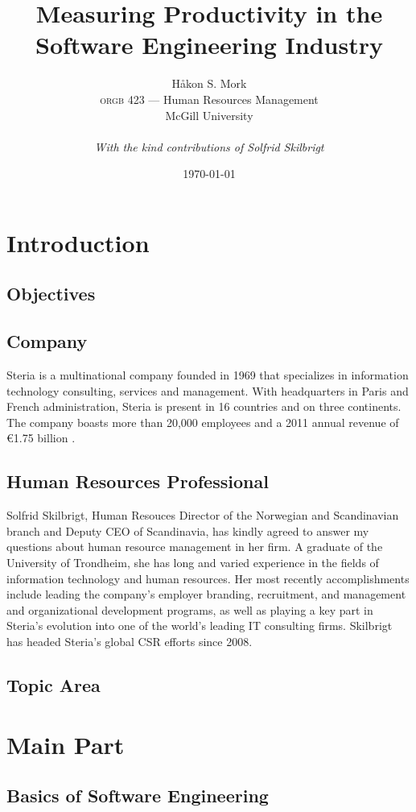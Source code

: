 \documentclass[letterpaper, 12pt]{report}
\title{\Huge \textbf{Measuring Productivity in the Software Engineering Industry}}
\author{
	Håkon S. Mork \\ 
	\textsc{orgb} 423 --- Human Resources Management \\
	McGill University \\
	\\
	\emph{With the kind contributions of Solfrid Skilbrigt}
}
\date{\today}
\begin{document}
\maketitle
\tableofcontents

\chapter{Introduction}
\section{Objectives}
\section{Company}
Steria is a multinational company founded in 1969 that specializes in information technology consulting, services and management. 
With headquarters in Paris and French administration, Steria is present in 16 countries and on three continents. 
The company boasts more than 20,000 employees and a 2011 annual revenue of €1.75 billion \parencite{steria:stats}.

\section{Human Resources Professional}
Solfrid Skilbrigt, Human Resouces Director of the Norwegian and Scandinavian branch and Deputy CEO of Scandinavia, has kindly agreed to answer my questions about human resource management in her firm. 
A graduate of the University of Trondheim, she has long and varied experience in the fields of information technology and human resources.
Her most recently accomplishments include leading the company's employer branding, recruitment, and management and organizational development programs, as well as playing a key part in Steria's evolution into one of the world's leading IT consulting firms. 
Skilbrigt has headed Steria's global CSR efforts since 2008.


\section{Topic Area}

\chapter{Main Part}
\section{Basics of Software Engineering}
\end{document}
